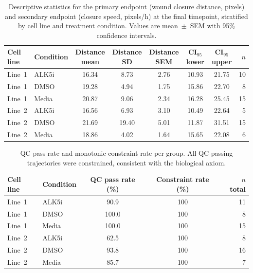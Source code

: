 \begin{table}[H]
\centering
\caption{Descriptive statistics for the primary endpoint (wound closure distance, pixels)
  and secondary endpoint (closure speed, pixels/h) at the final timepoint,
  stratified by cell line and treatment condition.
  Values are mean~$\pm$~SEM with 95\% confidence intervals.}
\label{tab:supp-descriptive}
\small
\begin{tabular}{ll
  S[table-format=2.2]
  S[table-format=2.2]
  S[table-format=2.2]
  S[table-format=2.2]
  S[table-format=2.2]
  r}
\toprule
{Cell line} & {Condition}
  & {Distance mean}
  & {Distance SD}
  & {Distance SEM}
  & {CI$_{95}$ lower}
  & {CI$_{95}$ upper}
  & {$n$} \\
\midrule
Line~1 & ALK5i & 16.34 &  8.73 & 2.76 & 10.93 & 21.75 & 10 \\
Line~1 & DMSO  & 19.28 &  4.94 & 1.75 & 15.86 & 22.70 &  8 \\
Line~1 & Media & 20.87 &  9.06 & 2.34 & 16.28 & 25.45 & 15 \\
Line~2 & ALK5i & 16.56 &  6.93 & 3.10 & 10.49 & 22.64 &  5 \\
Line~2 & DMSO  & 21.69 & 19.40 & 5.01 & 11.87 & 31.51 & 15 \\
Line~2 & Media & 18.86 &  4.02 & 1.64 & 15.65 & 22.08 &  6 \\
\bottomrule
\end{tabular}
\end{table}

\begin{table}[H]
\centering
\caption{QC pass rate and monotonic constraint rate per group.
  All QC-passing trajectories were constrained, consistent with the biological axiom.}
\label{tab:supp-qc-validation}
\begin{tabular}{ll
  S[table-format=3.1]
  S[table-format=3.0]
  r}
\toprule
{Cell line} & {Condition} & {QC pass rate (\%)} & {Constraint rate (\%)} & {$n$ total} \\
\midrule
Line~1 & ALK5i &  90.9 & 100 & 11 \\
Line~1 & DMSO  & 100.0 & 100 &  8 \\
Line~1 & Media & 100.0 & 100 & 15 \\
Line~2 & ALK5i &  62.5 & 100 &  8 \\
Line~2 & DMSO  &  93.8 & 100 & 16 \\
Line~2 & Media &  85.7 & 100 &  7 \\
\bottomrule
\end{tabular}
\end{table}

